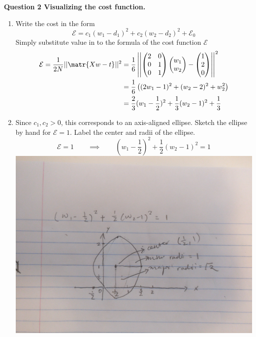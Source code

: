 \documentclass[11pt]{article}
\begin{document}
\textbf{Question 2 Visualizing the cost function.}


\begin{enumerate}
    \item Write the cost in the form 
    \[
        \mathcal{E} = c_1 (w_1 - d_1)^2 + c_2 (w_2- d_2)^2 + \mathcal{E}_0    
    \]
    Simply substitute value in to the formula of the cost function $\mathcal{E}$
    \begin{align*}
        \mathcal{E}
        = \frac{1}{2N} ||\matr{ Xw - t} ||^2
        &= \frac{1}{6} 
        \left|\left| 
        \begin{pmatrix}
            2 & 0 \\
            0 & 1 \\ 
            0 & 1 \\ 
        \end{pmatrix} 
        \begin{pmatrix}
            w_1 \\ w_2
        \end{pmatrix}
        -
        \begin{pmatrix} 
            1 \\ 2 \\ 0 \\
        \end{pmatrix} 
        \right|\right|^2 \\ 
        &= 
        \frac{1}{6} \left(
            (2w_1 - 1)^2 + (w_2 - 2)^2 + w_2^2
        \right) \\
        &= \frac{2}{3}(w_1 - \frac{1}{2})^2 + \frac{1}{3} (w_2 - 1)^2 + \frac{1}{3}
    \end{align*}
    \item Since $c_1, c_2 > 0$, this corresponds to an axis-aligned ellipse. Sketch the ellipse by hand for $\mathcal{E} = 1$. Label the center and radii of the ellipse. \\
    \[
        \mathcal{E} = 1 \quad \quad \implies \quad \quad 
        (w_1 - \frac{1}{2})^2 + \frac{1}{2} (w_2 - 1)^2 = 1
    \]
    \includegraphics[width=\textwidth]{ellipse.jpg}
\end{enumerate}
\end{document}
